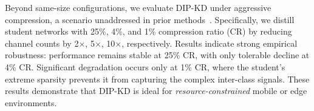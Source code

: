 \begin{foldable}
  Beyond same-size configurations, we evaluate DIP-KD under aggressive compression, a scenario unaddressed in prior methods~\cite{wang2021zero,zhang2022ideal,yuan2024data}.
  Specifically, we distill student networks with 25\%, 4\%, and 1\% compression ratio (CR) by reducing channel counts by 2$\times$, 5$\times$, 10$\times$, respectively.
  Results indicate strong empirical robustness: performance remains stable at 25\% CR, with only tolerable decline at 4\% CR.
  Significant degradation occurs only at 1\% CR, where the student's extreme sparsity prevents it from capturing the complex inter-class signals.
  These results demonstrate that DIP-KD is ideal for \textit{resource-constrained} mobile or edge environments.
\end{foldable}

